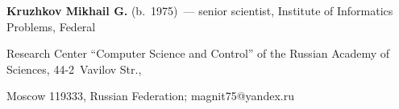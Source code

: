 \noindent


\textbf{Kruzhkov Mikhail G.} (b.\ 1975)~--- senior scientist, Institute of Informatics Problems, Federal 


Research Center ``Computer Science and Control'' of the Russian Academy of Sciences, 44-2~Vavilov Str., 


Moscow 119333, Russian Federation; \mbox{magnit75@yandex.ru}








\label{end\stat}





\renewcommand{\bibname}{\protect\rm Литература} 


